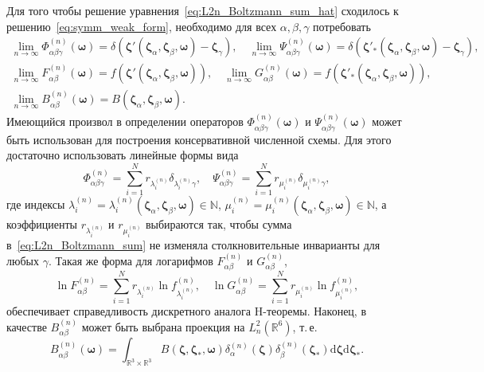 \documentclass{article}
\newcommand{\dd}{\mathrm{d}}
\newcommand{\dzeta}{\boldsymbol{\dd\zeta}}
\newcommand{\bzeta}{\boldsymbol{\zeta}}
\newcommand{\bomega}{\boldsymbol{\omega}}
\begin{document}
Для того чтобы решение уравнения~\eqref{eq:L2n_Boltzmann_sum_hat} сходилось к решению~\eqref{eq:symm_weak_form},
необходимо для всех \(\alpha,\beta,\gamma\) потребовать
\begin{gather}
    \lim_{n\to\infty} \Phi^{(n)}_{\alpha\beta\gamma}(\bomega) =
        \delta(\bzeta'(\bzeta_\alpha,\bzeta_\beta,\bomega)-\bzeta_\gamma), \quad
    \lim_{n\to\infty} \Psi^{(n)}_{\alpha\beta\gamma}(\bomega) =
        \delta(\bzeta'_*(\bzeta_\alpha,\bzeta_\beta,\bomega)-\bzeta_\gamma), \label{eq:PhiPsi_limit}\\
    \lim_{n\to\infty} F^{(n)}_{\alpha\beta}(\bomega) =
        f(\bzeta'(\bzeta_\alpha,\bzeta_\beta,\bomega)), \quad
    \lim_{n\to\infty} G^{(n)}_{\alpha\beta}(\bomega) =
        f(\bzeta'_*(\bzeta_\alpha,\bzeta_\beta,\bomega)), \label{eq:FG_limit}\\
    \lim_{n\to\infty} B^{(n)}_{\alpha\beta}(\bomega) =
        B(\bzeta_\alpha,\bzeta_\beta,\bomega). \label{eq:B_limit}
\end{gather}
Имеющийся произвол в определении операторов \(\Phi^{(n)}_{\alpha\beta\gamma}(\bomega)\) и \(\Psi^{(n)}_{\alpha\beta\gamma}(\bomega)\)
может быть использован для построения консервативной численной схемы.
Для этого достаточно использовать линейные формы вида
\begin{equation}\label{conservative_scheme}
    \Phi^{(n)}_{\alpha\beta\gamma} = \sum_{i=1}^N r_{\lambda^{(n)}_i} \delta_{\lambda^{(n)}_i\gamma}, \quad
    \Psi^{(n)}_{\alpha\beta\gamma} = \sum_{i=1}^N r_{\mu^{(n)}_i} \delta_{\mu^{(n)}_i\gamma},
\end{equation}
где индексы \(\lambda^{(n)}_i=\lambda^{(n)}_i(\bzeta_\alpha,\bzeta_\beta,\bomega)\in\mathbb{N}\),
\(\mu^{(n)}_i=\mu^{(n)}_i(\bzeta_\alpha,\bzeta_\beta,\bomega)\in\mathbb{N}\),
а коэффициенты \(r_{\lambda^{(n)}_i}\) и \(r_{\mu^{(n)}_i}\) выбираются так, чтобы сумма в~\eqref{eq:L2n_Boltzmann_sum}
не изменяла столкновительные инварианты для любых \(\gamma\).
Такая же форма для логарифмов \(F^{(n)}_{\alpha\beta}\) и \(G^{(n)}_{\alpha\beta}\),
\begin{equation}\label{htheorem_scheme}
    \ln F^{(n)}_{\alpha\beta} = \sum_{i=1}^N r_{\lambda^{(n)}_i} \ln f^{(n)}_{\lambda^{(n)}_i}, \quad
    \ln G^{(n)}_{\alpha\beta} = \sum_{i=1}^N r_{\mu^{(n)}_i} \ln f^{(n)}_{\mu^{(n)}_i},
\end{equation}
обеспечивает справедливость дискретного аналога H-теоремы.
Наконец, в качестве \(B^{(n)}_{\alpha\beta}\) может быть выбрана проекция на \(L^2_n(\mathbb{R}^6)\), т.\,е.
\begin{equation}\label{B_projection}
    B^{(n)}_{\alpha\beta}(\bomega) = \int_{\mathbb{R}^3\times\mathbb{R}^3} B(\bzeta,\bzeta_*,\bomega)
        \delta^{(n)}_\alpha(\bzeta) \delta^{(n)}_\beta(\bzeta_*) \dzeta\dzeta_*.
\end{equation}
\end{document}
